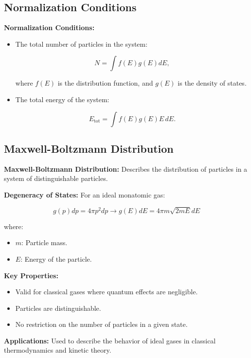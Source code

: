 \documentclass{article}
\newcommand{\eqbox}[1]{\begin{tcolorbox}[colback=gray!10] #1 \end{tcolorbox}}
\newcommand{\conceptbox}[1]{\begin{tcolorbox}[colback=blue!10] #1 \end{tcolorbox}}
\begin{document}
\subsection{Normalization Conditions}
\conceptbox{
\textbf{Normalization Conditions:}
\begin{itemize}
    \item The total number of particles in the system:
    \eqbox{
    \[
    N = \int f(E)g(E)dE,
    \]
    }
    where \( f(E) \) is the distribution function, and \( g(E) \) is the density of states.

    \item The total energy of the system:
    \eqbox{
    \[
    E_{\text{tot}} = \int f(E)g(E)E \, dE.
    \]
    }
\end{itemize}
}

\subsection{Maxwell-Boltzmann Distribution}
\conceptbox{
\textbf{Maxwell-Boltzmann Distribution:}
Describes the distribution of particles in a system of distinguishable particles.

\textbf{Degeneracy of States:}
For an ideal monatomic gas:
\eqbox{
\[
g(p)dp = 4\pi p^2 dp \to g(E)dE = 4\pi m \sqrt{2mE}dE
\]
}
where:
\begin{itemize}
    \item \( m \): Particle mass.
    \item \( E \): Energy of the particle.
\end{itemize}

\textbf{Key Properties:}
\begin{itemize}
    \item Valid for classical gases where quantum effects are negligible.
    \item Particles are distinguishable.
    \item No restriction on the number of particles in a given state.
\end{itemize}

\textbf{Applications:}
Used to describe the behavior of ideal gases in classical thermodynamics and kinetic theory.
}
\end{document}
